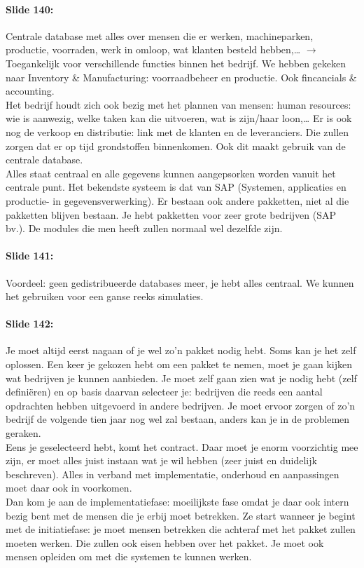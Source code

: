 \documentclass[10pt,a4paper]{report}
\begin{document}
\paragraph{Slide 140:} Centrale database met alles over mensen die er werken, machineparken, productie, voorraden, werk in omloop, wat klanten besteld hebben,… $\rightarrow$ Toegankelijk voor verschillende functies binnen het bedrijf. We hebben gekeken naar Inventory $\&$ Manufacturing: voorraadbeheer en productie. Ook fincancials $\&$ accounting.\\
Het bedrijf houdt zich ook bezig met het plannen van mensen: human resources: wie is aanwezig, welke taken kan die uitvoeren, wat is zijn/haar loon,… Er is ook nog de verkoop en distributie: link met de klanten en de leveranciers. Die zullen zorgen dat er op tijd grondstoffen binnenkomen. Ook dit maakt gebruik van de centrale database.\\
Alles staat centraal en alle gegevens kunnen aangepsorken worden vanuit het centrale punt.
Het bekendste systeem is dat van SAP (Systemen, applicaties en productie- in gegevensverwerking). Er bestaan ook andere pakketten, niet al die pakketten blijven bestaan. Je hebt pakketten voor zeer grote bedrijven (SAP bv.). De modules die men heeft zullen normaal wel dezelfde zijn.

\paragraph{Slide 141:} Voordeel: geen gedistribueerde databases meer, je hebt alles centraal. We kunnen het gebruiken voor een ganse reeks simulaties. 

\paragraph{Slide 142:} Je moet altijd eerst nagaan of je wel zo'n pakket nodig hebt. Soms kan je het zelf oplossen. Een keer je gekozen hebt om een pakket te nemen, moet je gaan kijken wat bedrijven je kunnen aanbieden. Je moet zelf gaan zien wat je nodig hebt (zelf defini\"eren) en op basis daarvan selecteer je: bedrijven die reeds een aantal opdrachten hebben uitgevoerd in andere bedrijven. Je moet ervoor zorgen of zo'n bedrijf de volgende tien jaar nog wel zal bestaan, anders kan je in de problemen geraken. \\
Eens je geselecteerd hebt, komt het contract. Daar moet je enorm voorzichtig mee zijn, er moet alles juist instaan wat je wil hebben (zeer juist en duidelijk beschreven). Alles in verband met implementatie, onderhoud en aanpassingen moet daar ook in voorkomen.\\
Dan kom je aan de implementatiefase: moeilijkste fase omdat je daar ook intern bezig bent met de mensen die je erbij moet betrekken. Ze start wanneer je begint met de initiatiefase: je moet mensen betrekken die achteraf met het pakket zullen moeten werken. Die zullen ook eisen hebben over het pakket. Je moet ook mensen opleiden om met die systemen te kunnen werken. 
\end{document}
